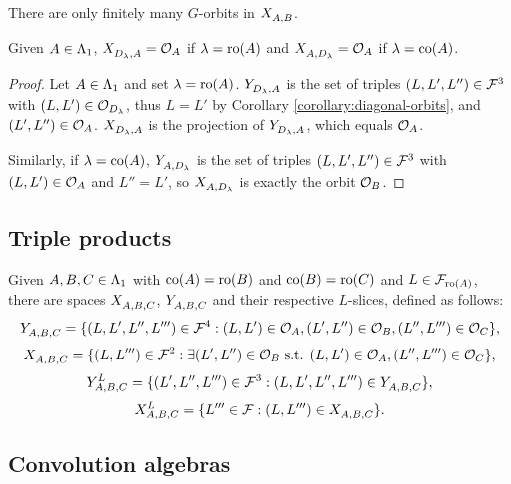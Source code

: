 \documentclass[a4paper, 11pt, twoside]{report}
\begin{document}
\begin{remark}
There are only finitely many $G$-orbits in $\xprod{A,B}$.
\end{remark}

\begin{lemma}\label{lemma:product-with-diagonal-orbits}
Given $A\in\matrices$, $\xprod{\diag{\lambda},A}=\orbit{A}$ if $\lambda=\ro{A}$ and $\xprod{A,\diag{\lambda}}=\orbit{A}$ if $\lambda=\co{A}$.
\end{lemma}

\begin{proof}
Let $A\in\matrices$ and set $\lambda=\ro{A}$. $\yprod{\diag{\lambda},A}$ is the set of triples $(L,L',L'')\in\flags^3$ with $(L,L')\in\orbit{\diag{\lambda}}$, thus $L=L'$ by Corollary \ref{corollary:diagonal-orbits}, and $(L',L'')\in\orbit{A}$. $\xprod{\diag{\lambda},A}$ is the projection of $\yprod{\diag{\lambda},A}$, which equals $\orbit{A}$.

Similarly, if $\lambda=\co{A}$, $\yprod{A,\diag{\lambda}}$ is the set of triples $(L,L',L'')\in\flags^3$ with $(L,L')\in\orbit{A}$ and $L''=L'$, so $\xprod{A,\diag{\lambda}}$ is exactly the orbit $\orbit{B}$.
\end{proof}

\subsection{Triple products}

Given $A,B,C\in\matrices$ with $\co{A}=\ro{B}$ and $\co{B}=\ro{C}$ and $L\in\flags_{\ro{A}}$, there are spaces $\xprod{A,B,C}$, $\yprod{A,B,C}$ and their respective $L$-slices, defined as follows:
\begin{equation*}
\yprod{A,B,C} = \{(L,L',L'',L''')\in\flags^4: (L,L')\in\orbit{A}, (L',L'')\in\orbit{B}, (L'',L''')\in\orbit{C}\},
\end{equation*}
\begin{equation*}
\xprod{A,B,C} = \{(L,L''')\in\flags^2: \exists (L',L'')\in\orbit{B}\text{ s.t. } (L,L')\in\orbit{A}, (L'',L''')\in\orbit{C}\},
\end{equation*}
\begin{equation*}
\yprod[L]{A,B,C} = \{ (L',L'',L''')\in\flags^3: (L,L',L'',L''')\in\yprod{A,B,C}\},
\end{equation*}
\begin{equation*}
\xprod[L]{A,B,C} = \{ L'''\in\flags: (L,L''')\in\xprod{A,B,C}\}.
\end{equation*}

\subsection{Convolution algebras}
\end{document}
